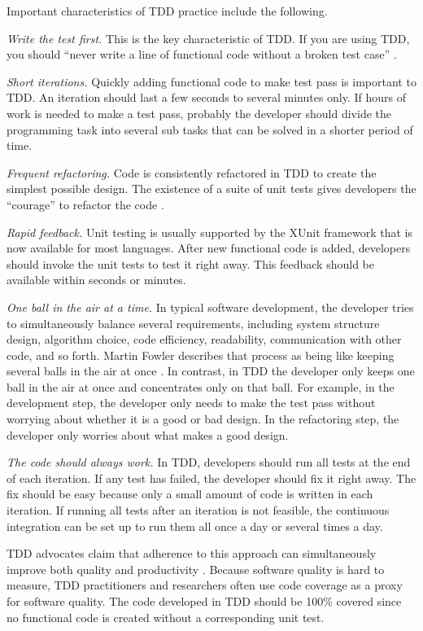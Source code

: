 \documentclass[smallextended]{svjour3}     %
\begin{document}
Important characteristics of TDD practice include the following.

{\em Write the test first.}
This is the key characteristic of TDD. If you are using 
TDD, you should ``never write a line of functional 
code without a broken test case'' \citep{Beck:01}. 

{\em Short iterations.}
Quickly adding functional code to make test pass is important
to TDD. An iteration should last a few seconds to 
several minutes only. If hours of work is needed to make a 
test pass, probably the developer should divide the programming 
task into several sub tasks that can be solved in a shorter
period of time. \citep{NeedReference}

{\em Frequent refactoring.}
Code is consistently refactored in TDD to create the simplest
possible design. The existence of a suite of unit tests gives 
developers the ``courage'' to refactor the code \citep{Beck:03}. 

{\em Rapid feedback.}
Unit testing is usually supported by the XUnit
framework that is now available for most languages.
After new functional code is added, developers should invoke
the unit tests to test it right away. This feedback should be available
within seconds or minutes. 

{\em One ball in the air at a time.}
In typical software development, the developer tries to simultaneously 
balance several requirements, including system structure design, algorithm choice, 
code efficiency, readability, communication with other code, and so forth.
Martin Fowler describes that process as being like keeping 
several balls in the air at once \citep{Beck:03}.
In contrast, in TDD the developer only keeps one ball in the air at once and 
concentrates only on that ball. For example, in the development
step, the developer only needs to make the test pass 
without worrying about whether it is a good or bad design. In 
the refactoring step, the developer only worries about what 
makes a good design. 

{\em The code should always work.} 
In TDD, developers should run 
all tests at the end of each iteration. If any test has failed, 
the developer should fix it right away. The fix should be easy because 
only a small amount of code is written in each iteration. If running 
all tests after an iteration is not feasible, the continuous 
integration can be set up to run them all once a day or several 
times a day. 

TDD advocates claim that adherence to this approach can simultaneously
improve both quality and productivity \citep{Beck:01,Janzen:05}.  Because
software quality is hard to measure, TDD practitioners and researchers
often use code coverage as a proxy for software quality. The code developed
in TDD should be 100\% covered since no functional code is created without
a corresponding unit test.
\end{document}
